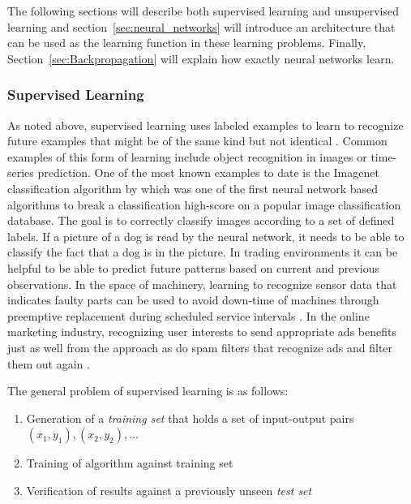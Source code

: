 The following sections will describe both supervised learning and unsupervised learning and section~\ref{sec:neural_networks} will introduce
an architecture that can be used as the learning function in these learning problems. Finally,
Section~\ref{sec:Backpropagation} will explain how exactly neural networks learn.

\subsubsection{Supervised Learning}



As noted above, supervised learning uses labeled examples to learn to recognize future examples that might be of the
same kind but not identical \cite[p.695]{russell2016artificial}. Common examples of this form of learning include object recognition in images or
time-series prediction. One of the most known examples to date is the Imagenet classification algorithm by
\citep{krizhevsky2012imagenet} which was one of the first neural network based algorithms to break a classification high-score
on a popular image classification database. The goal is to correctly classify images according to a set of defined
labels. If a picture of a dog is read by the neural network, it needs to be able to classify the fact that a dog is in the
picture. In trading environments it can be helpful to be able to predict future patterns based on current and previous
observations. In the space of machinery, learning to recognize sensor data that indicates faulty parts can be used to
avoid down-time of machines through preemptive replacement during scheduled service intervals \citep{rudin2012machine}. In the online marketing
industry, recognizing user interests to send appropriate ads benefits just as well from the approach as do spam filters
that recognize ads and filter them out again \citep{domingos2012few}.

The general problem of supervised learning is as follows:

\begin{enumerate}
    \item Generation of a \emph{training set} that holds a set of input-output pairs \\ $(x_1,y_1),(x_2,y_2),\ldots$
    \item Training of algorithm against training set
    \item Verification of results against a previously unseen \emph{test set}
\end{enumerate}

